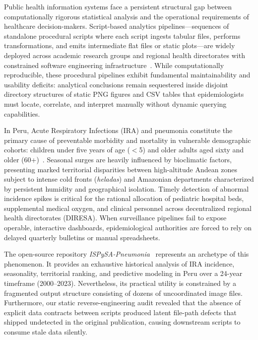 \documentclass[conference]{IEEEtran}
\begin{document}
Public health information systems face a persistent structural gap between computationally rigorous statistical analysis and the operational requirements of healthcare decision-makers. Script-based analytics pipelines---sequences of standalone procedural scripts where each script ingests tabular files, performs transformations, and emits intermediate flat files or static plots---are widely deployed across academic research groups and regional health directorates with constrained software engineering infrastructure~\cite{Feathers2004}. While computationally reproducible, these procedural pipelines exhibit fundamental maintainability and usability deficits: analytical conclusions remain sequestered inside disjoint directory structures of static PNG figures and CSV tables that epidemiologists must locate, correlate, and interpret manually without dynamic querying capabilities.

In Peru, Acute Respiratory Infections (IRA) and pneumonia constitute the primary cause of preventable morbidity and mortality in vulnerable demographic cohorts: children under five years of age ($<$5) and older adults aged sixty and older (60+)~\cite{PAHO2011}. Seasonal surges are heavily influenced by bioclimatic factors, presenting marked territorial disparities between high-altitude Andean zones subject to intense cold fronts (\textit{heladas}) and Amazonian departments characterized by persistent humidity and geographical isolation. Timely detection of abnormal incidence spikes is critical for the rational allocation of pediatric hospital beds, supplemental medical oxygen, and clinical personnel across decentralized regional health directorates (DIRESA). When surveillance pipelines fail to expose operable, interactive dashboards, epidemiological authorities are forced to rely on delayed quarterly bulletins or manual spreadsheets.

The open-source repository \textit{ISPySA-Pneumonia}~\cite{Danala2024} represents an archetype of this phenomenon. It provides an exhaustive historical analysis of IRA incidence, seasonality, territorial ranking, and predictive modeling in Peru over a 24-year timeframe (2000--2023). Nevertheless, its practical utility is constrained by a fragmented output structure consisting of dozens of uncoordinated image files. Furthermore, our static reverse-engineering audit revealed that the absence of explicit data contracts between scripts produced latent file-path defects that shipped undetected in the original publication, causing downstream scripts to consume stale data silently.
\end{document}
